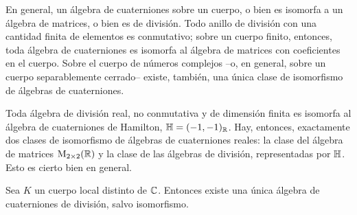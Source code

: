 En general, un \'{a}lgebra de cuaterniones sobre un cuerpo, o bien es isomorfa
a un \'{a}lgebra de matrices, o bien es de divisi\'{o}n. Todo anillo de
divisi\'{o}n con una cantidad finita de elementos es conmutativo; sobre un
cuerpo finito, entonces, toda \'{a}lgebra de cuaterniones es isomorfa al
\'{a}lgebra de matrices con coeficientes en el cuerpo. Sobre el cuerpo de
n\'{u}meros complejos --o, en general, sobre un cuerpo separablemente cerrado--
existe, tambi\'{e}n, una \'{u}nica clase de isomorfismo de \'{a}lgebras de
cuaterniones.

Toda \'{a}lgebra de divisi\'{o}n real, no conmutativa y de dimensi\'{o}n finita
es isomorfa al \'{a}lgebra de cuaterniones de Hamilton,
$\bb{H}=\varquatalg[\bb{R}]{-1,-1}$. Hay, entonces, exactamente dos clases de
isomorfismo de \'{a}lgebras de cuaterniones reales: la clase del \'{a}lgebra de
matrices $\MM_{2\times 2}(\bb{R})$ y la clase de las \'{a}lgebras de
divisi\'{o}n, representadas por $\bb{H}$.
%
Esto es cierto bien en general.

\begin{teoClassificationSurUnCorpsLocal}
 \label{thm:clasificacionlocal}
 Sea $K$ un cuerpo local distinto de $\bb{C}$. Entonces existe una \'{u}nica
 \'{a}lgebra de cuaterniones de divisi\'{o}n, salvo isomorfismo.
\end{teoClassificationSurUnCorpsLocal}
